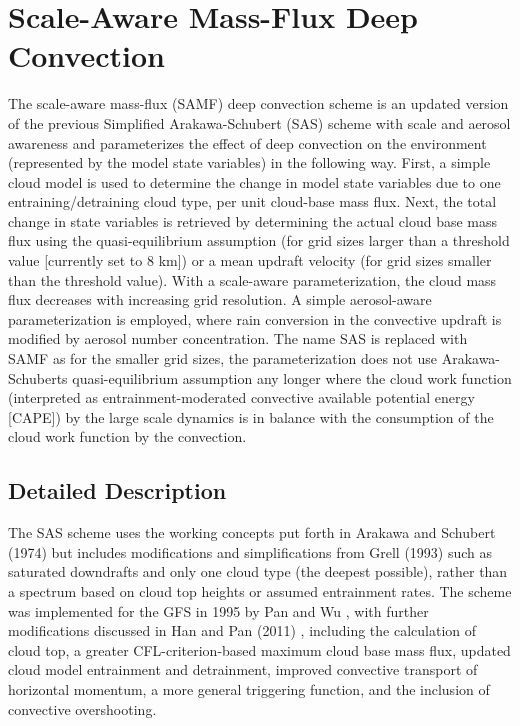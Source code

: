 \hypertarget{group___s_a_m_f}{}\section{Scale-\/\+Aware Mass-\/\+Flux Deep Convection}
\label{group___s_a_m_f}


The scale-\/aware mass-\/flux (S\+A\+MF) deep convection scheme is an updated version of the previous Simplified Arakawa-\/\+Schubert (S\+AS) scheme with scale and aerosol awareness and parameterizes the effect of deep convection on the environment (represented by the model state variables) in the following way. First, a simple cloud model is used to determine the change in model state variables due to one entraining/detraining cloud type, per unit cloud-\/base mass flux. Next, the total change in state variables is retrieved by determining the actual cloud base mass flux using the quasi-\/equilibrium assumption (for grid sizes larger than a threshold value \mbox{[}currently set to 8 km\mbox{]}) or a mean updraft velocity (for grid sizes smaller than the threshold value). With a scale-\/aware parameterization, the cloud mass flux decreases with increasing grid resolution. A simple aerosol-\/aware parameterization is employed, where rain conversion in the convective updraft is modified by aerosol number concentration. The name S\+AS is replaced with S\+A\+MF as for the smaller grid sizes, the parameterization does not use Arakawa-\/\+Schubert\textquotesingle{}s quasi-\/equilibrium assumption any longer where the cloud work function (interpreted as entrainment-\/moderated convective available potential energy \mbox{[}C\+A\+PE\mbox{]}) by the large scale dynamics is in balance with the consumption of the cloud work function by the convection.  




\subsection{Detailed Description}
The S\+AS scheme uses the working concepts put forth in Arakawa and Schubert (1974) \cite{arakawa_and_schubert_1974} but includes modifications and simplifications from Grell (1993) \cite{grell_1993} such as saturated downdrafts and only one cloud type (the deepest possible), rather than a spectrum based on cloud top heights or assumed entrainment rates. The scheme was implemented for the G\+FS in 1995 by Pan and Wu \cite{pan_and_wu_1995}, with further modifications discussed in Han and Pan (2011) \cite{han_and_pan_2011} , including the calculation of cloud top, a greater C\+F\+L-\/criterion-\/based maximum cloud base mass flux, updated cloud model entrainment and detrainment, improved convective transport of horizontal momentum, a more general triggering function, and the inclusion of convective overshooting.

